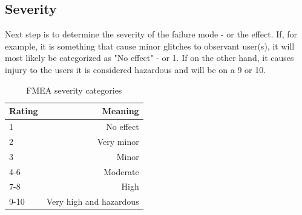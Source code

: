 \subsection{Severity}
\label{sec:fmea_severity}
Next step is to determine the severity of the failure mode - or the effect. If, for example, it is something that cause minor glitches to observant user(s), it will most likely be categorized as "No effect" - or 1.
If on the other hand, it causes injury to the users it is considered hazardous and will be on a 9 or 10.

\begin{table}[h]
\centering
    \begin{tabular}{ | l | r | }
    \hline
    Rating & Meaning \\ \hline \hline
    1      & No effect  \\ \hline
    2      & Very minor \\ \hline
    3      & Minor \\ \hline
    4-6    & Moderate \\ \hline
    7-8    & High \\ \hline
    9-10   & Very high and hazardous \\ \hline
    \end{tabular}
\caption{FMEA severity categories}
\label{table:fmea_severities}
\end{table}


